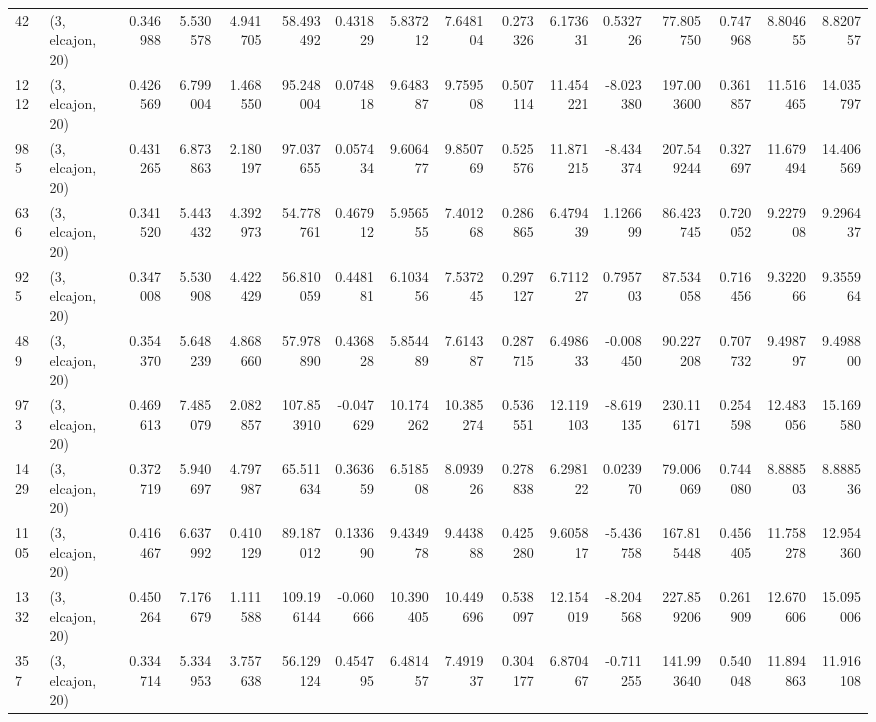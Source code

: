 \begin{tabular}{llrrrrrrrrrrrrrr}
42   &  (3, elcajon, 20) &   0.346988 &   5.530578 &   4.941705 &     58.493492 &    0.431829 &    5.837212 &    7.648104 &  0.273326 &   6.173631 &   0.532726 &    77.805750 &   0.747968 &   8.804655 &   8.820757 \\
1212 &  (3, elcajon, 20) &   0.426569 &   6.799004 &   1.468550 &     95.248004 &    0.074818 &    9.648387 &    9.759508 &  0.507114 &  11.454221 &  -8.023380 &   197.003600 &   0.361857 &  11.516465 &  14.035797 \\
985  &  (3, elcajon, 20) &   0.431265 &   6.873863 &   2.180197 &     97.037655 &    0.057434 &    9.606477 &    9.850769 &  0.525576 &  11.871215 &  -8.434374 &   207.549244 &   0.327697 &  11.679494 &  14.406569 \\
636  &  (3, elcajon, 20) &   0.341520 &   5.443432 &   4.392973 &     54.778761 &    0.467912 &    5.956555 &    7.401268 &  0.286865 &   6.479439 &   1.126699 &    86.423745 &   0.720052 &   9.227908 &   9.296437 \\
925  &  (3, elcajon, 20) &   0.347008 &   5.530908 &   4.422429 &     56.810059 &    0.448181 &    6.103456 &    7.537245 &  0.297127 &   6.711227 &   0.795703 &    87.534058 &   0.716456 &   9.322066 &   9.355964 \\
489  &  (3, elcajon, 20) &   0.354370 &   5.648239 &   4.868660 &     57.978890 &    0.436828 &    5.854489 &    7.614387 &  0.287715 &   6.498633 &  -0.008450 &    90.227208 &   0.707732 &   9.498797 &   9.498800 \\
973  &  (3, elcajon, 20) &   0.469613 &   7.485079 &   2.082857 &    107.853910 &   -0.047629 &   10.174262 &   10.385274 &  0.536551 &  12.119103 &  -8.619135 &   230.116171 &   0.254598 &  12.483056 &  15.169580 \\
1429 &  (3, elcajon, 20) &   0.372719 &   5.940697 &   4.797987 &     65.511634 &    0.363659 &    6.518508 &    8.093926 &  0.278838 &   6.298122 &   0.023970 &    79.006069 &   0.744080 &   8.888503 &   8.888536 \\
1105 &  (3, elcajon, 20) &   0.416467 &   6.637992 &   0.410129 &     89.187012 &    0.133690 &    9.434978 &    9.443888 &  0.425280 &   9.605817 &  -5.436758 &   167.815448 &   0.456405 &  11.758278 &  12.954360 \\
1332 &  (3, elcajon, 20) &   0.450264 &   7.176679 &   1.111588 &    109.196144 &   -0.060666 &   10.390405 &   10.449696 &  0.538097 &  12.154019 &  -8.204568 &   227.859206 &   0.261909 &  12.670606 &  15.095006 \\
357  &  (3, elcajon, 20) &   0.334714 &   5.334953 &   3.757638 &     56.129124 &    0.454795 &    6.481457 &    7.491937 &  0.304177 &   6.870467 &  -0.711255 &   141.993640 &   0.540048 &  11.894863 &  11.916108 \\

\end{tabular}
